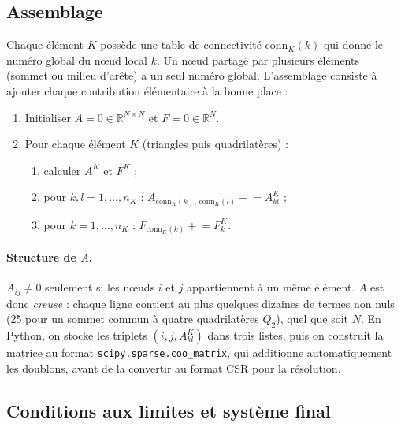 \documentclass[11pt,a4paper]{article}
\begin{document}
\subsection{Assemblage}

Chaque élément $K$ possède une table de connectivité
$\mathrm{conn}_K(k)$ qui donne le numéro global du nœud local $k$. Un nœud
partagé par plusieurs éléments (sommet ou milieu d'arête) a un seul numéro
global. L'assemblage consiste à ajouter chaque contribution élémentaire à
la bonne place :
\begin{enumerate}
  \item Initialiser $A = 0 \in \mathbb{R}^{N \times N}$ et
        $F = 0 \in \mathbb{R}^{N}$.
  \item Pour chaque élément $K$ (triangles puis quadrilatères) :
        \begin{enumerate}
          \item calculer $A^K$ et $F^K$ ;
          \item pour $k, l = 1, \dots, n_K$ :
                $A_{\mathrm{conn}_K(k),\,\mathrm{conn}_K(l)} \mathrel{+}= A^K_{kl}$ ;
          \item pour $k = 1, \dots, n_K$ :
                $F_{\mathrm{conn}_K(k)} \mathrel{+}= F^K_k$.
        \end{enumerate}
\end{enumerate}

\paragraph{Structure de $A$.} $A_{ij} \neq 0$ seulement si les nœuds $i$ et
$j$ appartiennent à un même élément. $A$ est donc \emph{creuse} : chaque
ligne contient au plus quelques dizaines de termes non nuls (25 pour un
sommet commun à quatre quadrilatères $Q_2$), quel que soit $N$. En Python,
on stocke les triplets $(i, j, A^K_{kl})$ dans trois listes, puis on
construit la matrice au format \texttt{scipy.sparse.coo\_matrix}, qui
additionne automatiquement les doublons, avant de la convertir au format
CSR pour la résolution.

\subsection{Conditions aux limites et système final}
\label{sec:dirichlet}
\end{document}
